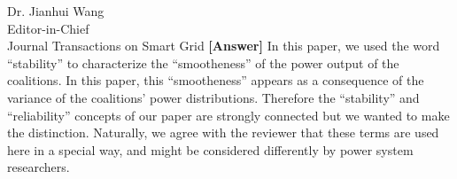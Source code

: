 \documentclass{letter}
\begin{document}
\begin{letter}{Dr. Jianhui Wang \\ Editor-in-Chief \\ Journal Transactions on Smart Grid }
\textbf{[Answer]} In this paper, we used the word “stability” to characterize the “smootheness” of the power output of the coalitions. In this paper, this “smootheness” appears as a consequence of the variance of the coalitions’ power distributions. Therefore the “stability” and “reliability” concepts of our paper are strongly connected but we wanted to make the distinction. Naturally, we agree with the reviewer that these terms are used here in a special way, and might be considered differently by power system researchers.




\end{letter}
\end{document}
